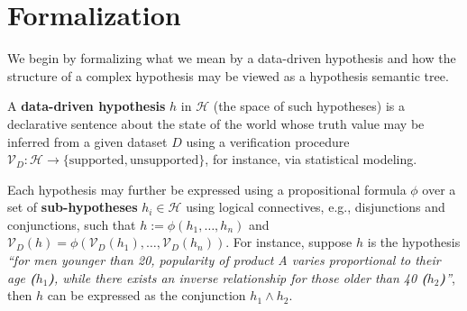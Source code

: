 
\section{Formalization}
\label{sec:background}

We begin by formalizing what we mean by a data-driven hypothesis and how the structure of a complex hypothesis may be viewed as a hypothesis semantic tree.

A \textbf{data-driven hypothesis} $h$ in $\mathcal{H}$ (the space of such hypotheses) is a declarative sentence about the state of the world whose truth value may be inferred from a given dataset $D$ using a verification procedure $\mathcal{V}_D:\mathcal{H} \to \{\mathrm{supported}, \mathrm{unsupported}\}$, for instance, via statistical modeling. 

Each hypothesis may further be expressed using a propositional formula $\phi$ over a set of \textbf{sub-hypotheses} $h_i \in \mathcal{H}$ using logical connectives, e.g., disjunctions and conjunctions, such that $h := \phi(h_1, \ldots, h_n)$ and $\mathcal{V}_D(h)=\phi(\mathcal{V}_D(h_1),\ldots,\mathcal{V}_D(h_n))$. For instance, suppose $h$ is the hypothesis \textit{``for men younger than 20, popularity of product A varies proportional to their age \textbf{($h_1$)}, while there exists an inverse relationship for those older than 40 \textbf{($h_2$)}''}, then $h$ can be expressed as the conjunction $h_1 \wedge h_2$.

